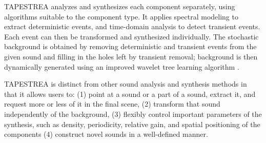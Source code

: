 \documentclass[a4paper]{article}
\begin{document}

TAPESTREA analyzes and synthesizes each component separately, using algorithms suitable 
to the component type. It applies spectral modeling \cite{Serra89} to extract deterministic 
events, and time-domain analysis to detect transient events. Each event can then be 
transformed and synthesized individually. The stochastic background is obtained by 
removing deterministic and transient events from the given sound and filling in the 
holes left by transient removal; background is then dynamically generated using an improved wavelet 
tree learning algorithm \cite{Dubnov02}.

TAPESTREA is distinct from other sound analysis and synthesis methods in that it allows users to:
(1) point at a sound or a part of a sound, extract it, and request more or less of it in the final scene,
(2) transform that sound independently of the background,
(3) flexibly control important parameters of the synthesis, such as density, periodicity, relative gain, and spatial positioning of the components
(4) construct novel sounds in a well-defined manner.


\end{document}
